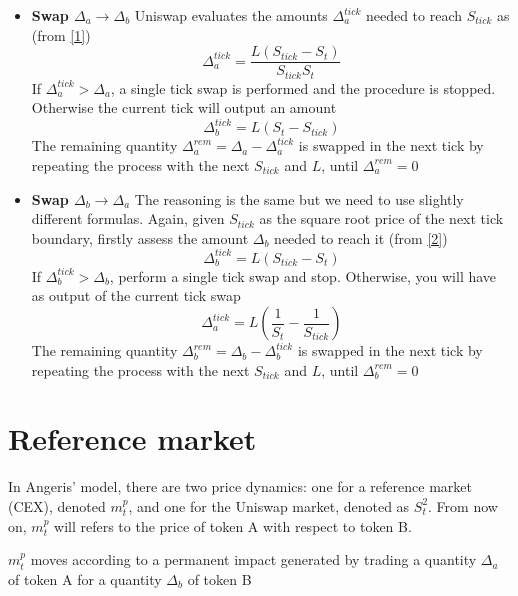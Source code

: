\documentclass[a4paper,11pt]{article}
\begin{document}
\begin{itemize}
    \item \textbf{Swap $\Delta_a \to \Delta_b$ }
    Uniswap evaluates the amounts $\Delta_{a}^{tick}$ needed to reach $S_{tick}$ as (from \ref{1})
    \begin{equation}
        \Delta_{a}^{tick} = \frac{L(S_{tick}-S_t)}{{S_{tick}S_t}}
    \end{equation}
    If $\Delta_{a}^{tick} > \Delta_a$, a single tick swap is performed and the procedure is stopped. Otherwise the current tick will output an amount 
    \begin{equation}
        \Delta_{b}^{tick} = L (S_t-S_{tick})
    \end{equation}
    The remaining quantity $\Delta_{a}^{rem} = \Delta_a-\Delta_a^{tick}$ is swapped in the next tick by repeating the process with the next $S_{tick}$ and $L$, until $\Delta_{a}^{rem}=0$
    \item \textbf{Swap $\Delta_b \to \Delta_a$ }
    The reasoning is the same but we need to use slightly different formulas.
    Again, given $S_{tick}$ as the square root price of the next tick boundary, firstly assess the amount $\Delta_b$ needed to reach it (from \ref{2})
    \begin{equation}
        \Delta_b^{tick} = L(S_{tick} - S_t)
    \end{equation}
    If $\Delta_{b}^{tick} > \Delta_b$, perform a single tick swap and stop. Otherwise, you will have as output of the current tick swap
    \begin{equation}
        \Delta_{a}^{tick}=L\left(\frac{1}{S_t}-\frac{1}{S_{tick}}\right)
    \end{equation}
    The remaining quantity $\Delta_{b}^{rem} = \Delta_b-\Delta_b^{tick}$ is swapped in the next tick by repeating the process with the next $S_{tick}$ and $L$, until $\Delta_{b}^{rem}=0$
\end{itemize}

\section{Reference market}
In Angeris’ model, there are two price dynamics: one for a reference market (CEX), denoted $m^p_t$, and one for the Uniswap market, denoted as $S^2_t$. From now on, $m^p_t$ will refers to the price of token A with respect to token B.

 $m^p_t$ moves according to a permanent impact generated by trading a quantity $\Delta_a$ of token A for a quantity $\Delta_b$ of token B
\end{document}
